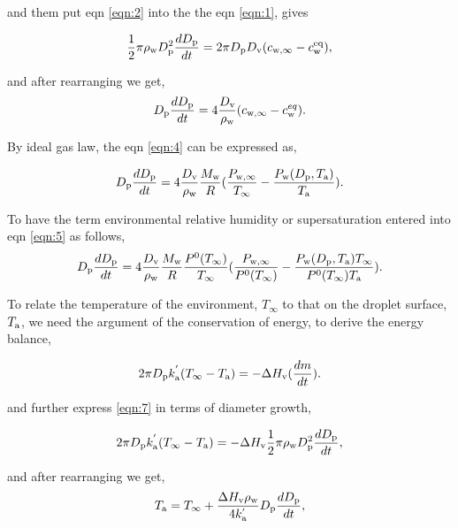 \documentclass[12pt]{article}
\begin{document}
and them put eqn \ref{eqn:2} into the the eqn \ref{eqn:1}, gives

\begin{equation}\label{eqn:3}
\frac{1}{2} \pi \rho_{\rm w} D_{\rm p}^{2} \frac{dD_{\rm p}}{dt}= 2 \pi D_{\rm p} D_{\rm v} (c_{\rm w, \infty} - c_{\rm w}^{\rm eq}),
\end{equation}

and after rearranging we get, 
\begin{equation}\label{eqn:4}
D_{\rm p}\frac{dD_{\rm p}}{dt}=4 \frac{D_{\rm v}} {\rho_{\rm w}} (c_{\rm w, \infty} - c_{\rm w}^{eq}).
\end{equation}

By ideal gas law, the eqn \ref{eqn:4} can be expressed as,

\begin{equation}\label{eqn:5}
D_{\rm p}\frac{dD_{\rm p}}{dt}=4 \frac{D_{\rm v}} {\rho_{\rm w}} \frac{M_{\rm w}}{R} (\frac{P_{\rm w, \infty}}{T_{\infty}} - \frac{P_{\rm w}(D_{\rm p}, T_{\rm a})}{T_{\rm a}}).
\end{equation}

To have the term environmental relative humidity or supersaturation entered into eqn \ref{eqn:5} as follows,  
\begin{equation}\label{eqn:6}
D_{\rm p}\frac{dD_{\rm p}}{dt}=4  \frac{D_{\rm v}} {\rho_{\rm w}} \frac{M_{\rm w}}{R} \frac{P^{\rm 0}(T_{\infty})} {T_{\infty}} (\frac{P_{\rm w, \infty}}{P^{\rm 0}(T_{\infty})} - \frac{P_{\rm w}(D_{\rm p}, T_{\rm a}) T_{\infty}}{P^{\rm 0}(T_{\infty}) T_{\rm a}}).
\end{equation}

To relate the temperature of the environment, $T_{\infty}$ to that on the droplet surface, $T_{\rm a}$, we need the argument of the conservation of energy, to derive the energy balance,

\begin{equation}\label{eqn:7}
2 \pi D_{\rm p} k^{'}_{\rm a} (T_{\infty}-T_{\rm a})= -\Delta H_{\rm v}(\frac{dm}{dt}).
\end{equation}

and further express \ref{eqn:7} in terms of diameter growth, 

\begin{equation}\label{eqn:8}
2 \pi D_{\rm p} k^{'}_{\rm a} (T_{\infty}-T_{\rm a})= -\Delta H_{\rm v} \frac{1}{2} \pi \rho_{\rm w} D_{\rm p}^{2} \frac{dD_{\rm p}}{dt},
\end{equation}

and after rearranging we get, 
\begin{equation}\label{eqn:9}
T_{\rm a}= T_{\infty} + \frac{\Delta H_{\rm v}  \rho_{\rm w}}{4 k^{'}_{\rm a}} D_{\rm p} \frac{dD_{\rm p}}{dt},
\end{equation}
\end{document}
